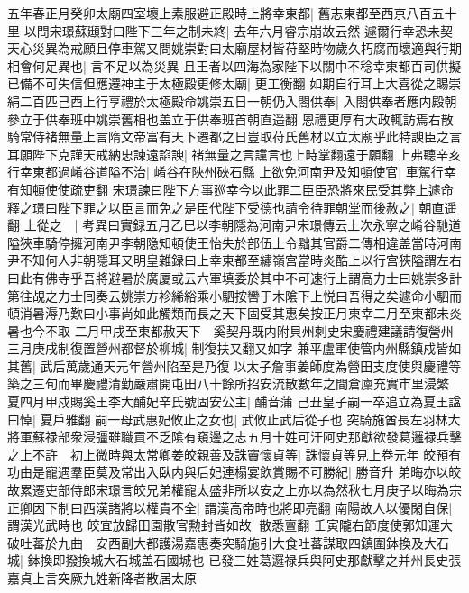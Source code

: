 五年春正月癸卯太廟四室壞上素服避正殿時上將幸東都|{
	舊志東都至西京八百五十里}
以問宋璟蘇頲對曰陛下三年之制未終|{
	去年六月睿宗崩故云然}
遽爾行幸恐未契天心災異為戒願且停車駕又問姚崇對曰太廟屋材皆苻堅時物歲久朽腐而壞適與行期相會何足異也|{
	言不足以為災異}
且王者以四海為家陛下以關中不稔幸東都百司供擬已備不可失信但應遷神主于太極殿更修太廟|{
	更工衡翻}
如期自行耳上大喜從之賜崇絹二百匹己酉上行享禮於太極殿命姚崇五日一朝仍入閤供奉|{
	入閤供奉者應内殿朝參立于供奉班中姚崇舊相也盖立于供奉班首朝直遥翻}
恩禮更厚有大政輒訪焉右散騎常侍禇無量上言隋文帝富有天下遷都之日豈取苻氏舊材以立太廟乎此特諛臣之言耳願陛下克謹天戒納忠諫遠諂諛|{
	禇無量之言讜言也上時掌翻遠于願翻}
上弗聽辛亥行幸東都過崤谷道隘不治|{
	崤谷在陜州硤石縣}
上欲免河南尹及知頓使官|{
	車駕行幸有知頓使使疏吏翻}
宋璟諫曰陛下方事廵幸今以此罪二臣臣恐將來民受其弊上遽命釋之璟曰陛下罪之以臣言而免之是臣代陛下受德也請令待罪朝堂而後赦之|{
	朝直遥翻}
上從之　|{
	考異曰實録五月乙巳以李朝隱為河南尹宋璟傳云上次永寧之崤谷馳道隘狹車騎停擁河南尹李朝隐知頓使王怡失於部伍上令黜其官爵二傳相違盖當時河南尹不知何人非朝隱耳又明皇雜録曰上幸東都至繡嶺宫當時炎酷上以行宫狹隘謂左右曰此有佛寺乎吾將避暑於廣厦或云六軍填委於其中不可速行上謂高力士曰姚崇多計第往覘之力士囘奏云姚崇方袗絺綌乘小駟按轡于木隂下上悦曰吾得之矣遽命小駟而頓消暑溽乃歎曰小事尚如此觸類而長之天下固受其惠矣按正月東幸二月至東都未炎暑也今不取}
二月甲戌至東都赦天下　奚契丹既内附貝州刺史宋慶禮建議請復營州三月庚戌制復置營州都督於柳城|{
	制復扶又翻又如字}
兼平盧軍使管内州縣鎮戍皆如其舊|{
	武后萬歲通天元年營州陷至是乃復}
以太子詹事姜師度為營田支度使與慶禮等築之三旬而畢慶禮清勤嚴肅開屯田八十餘所招安流散數年之間倉廩充實市里浸繁　夏四月甲戍賜奚王李大酺妃辛氏號固安公主|{
	酺音蒲}
己丑皇子嗣一卒追立為夏王諡曰悼|{
	夏戶雅翻}
嗣一母武惠妃攸止之女也|{
	武攸止武后從子也}
突騎施酋長左羽林大將軍蘇禄部衆浸彊雖職貢不乏隂有窺邊之志五月十姓可汗阿史那獻欲發葛邏禄兵擊之上不許　初上微時與太常卿姜皎親善及誅竇懷貞等|{
	誅懷貞等見上卷元年}
皎預有功由是寵遇羣臣莫及常出入臥内與后妃連榻宴飲賞賜不可勝紀|{
	勝音升}
弟晦亦以皎故累遷吏部侍郎宋璟言皎兄弟權寵太盛非所以安之上亦以為然秋七月庚子以晦為宗正卿因下制曰西漢諸將以權貴不全|{
	謂漢高帝時也將即亮翻}
南陽故人以優閑自保|{
	謂漢光武時也}
皎宜放歸田園散官勲封皆如故|{
	散悉亶翻}
壬寅隴右節度使郭知運大破吐蕃於九曲　安西副大都護湯嘉惠奏突騎施引大食吐蕃謀取四鎮圍鉢換及大石城|{
	鉢換即撥換城大石城盖石國城也}
已發三姓葛邏禄兵與阿史那獻擊之并州長史張嘉貞上言突厥九姓新降者散居太原

